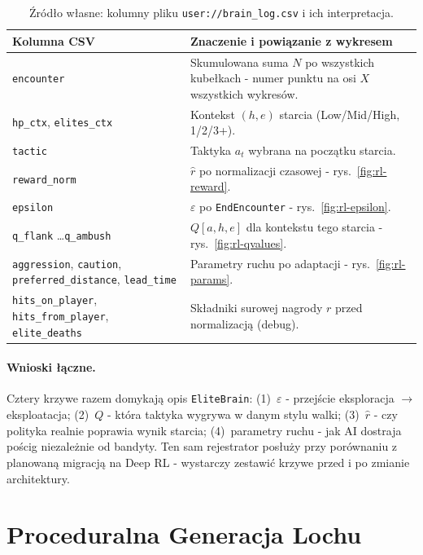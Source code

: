 \begin{table}[htbp]
\centering
\small
\begin{tabular}{|p{}|p{}|}
\hline
\textbf{Kolumna CSV} & \textbf{Znaczenie i powiązanie z wykresem} \\
\hline
\texttt{encounter} & Skumulowana suma $N$ po wszystkich kubełkach - numer punktu na osi $X$ wszystkich wykresów. \\
\hline
\texttt{hp\_ctx}, \texttt{elites\_ctx} & Kontekst $(h,e)$ starcia (Low/Mid/High, 1/2/3+). \\
\hline
\texttt{tactic} & Taktyka $a_t$ wybrana na początku starcia. \\
\hline
\texttt{reward\_norm} & $\hat r$ po normalizacji czasowej - rys.~\ref{fig:rl-reward}. \\
\hline
\texttt{epsilon} & $\varepsilon$ po \texttt{EndEncounter} - rys.~\ref{fig:rl-epsilon}. \\
\hline
\texttt{q\_flank} \ldots \texttt{q\_ambush} & $Q[a,h,e]$ dla kontekstu tego starcia - rys.~\ref{fig:rl-qvalues}. \\
\hline
\texttt{aggression}, \texttt{caution}, \texttt{preferred\_distance}, \texttt{lead\_time} & Parametry ruchu po adaptacji - rys.~\ref{fig:rl-params}. \\
\hline
\texttt{hits\_on\_player}, \texttt{hits\_from\_player}, \texttt{elite\_deaths} & Składniki surowej nagrody $r$ przed normalizacją (debug). \\
\hline
\end{tabular}
\caption{Źródło własne: kolumny pliku \texttt{user://brain\_log.csv} i ich interpretacja.}
\label{tab:brain-log-cols}
\end{table}

\paragraph{Wnioski łączne.} Cztery krzywe razem domykają opis \texttt{EliteBrain}: (1)~$\varepsilon$ - przejście eksploracja $\rightarrow$ eksploatacja; (2)~$Q$ - która taktyka wygrywa w danym stylu walki; (3)~$\hat r$ - czy polityka realnie poprawia wynik starcia; (4)~parametry ruchu - jak AI dostraja pościg niezależnie od bandyty. Ten sam rejestrator posłuży przy porównaniu z planowaną migracją na Deep RL - wystarczy zestawić krzywe przed i po zmianie architektury.

\FloatBarrier
\section{Proceduralna Generacja Lochu}

